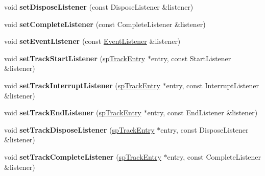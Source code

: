 \begin{DoxyCompactItemize}
void {\bfseries set\+Dispose\+Listener} (const Dispose\+Listener \&listener)
\item 
\mbox{\label{classspine_1_1SkeletonAnimation_a90da8648913d4abfa84f8b70ed5b7127}} 
void {\bfseries set\+Complete\+Listener} (const Complete\+Listener \&listener)
\item 
\mbox{\label{classspine_1_1SkeletonAnimation_add74538b2e902a827405724cefc2a5e1}} 
void {\bfseries set\+Event\+Listener} (const \hyperlink{classEventListener}{Event\+Listener} \&listener)
\item 
\mbox{\label{classspine_1_1SkeletonAnimation_a29901a201785b3f8ac7949756a6b1748}} 
void {\bfseries set\+Track\+Start\+Listener} (\hyperlink{structspTrackEntry}{sp\+Track\+Entry} $\ast$entry, const Start\+Listener \&listener)
\item 
\mbox{\label{classspine_1_1SkeletonAnimation_a39bbbe7345de1eec4015ab3636f51d6f}} 
void {\bfseries set\+Track\+Interrupt\+Listener} (\hyperlink{structspTrackEntry}{sp\+Track\+Entry} $\ast$entry, const Interrupt\+Listener \&listener)
\item 
\mbox{\label{classspine_1_1SkeletonAnimation_a64aca05c942018c39312b94d958b75de}} 
void {\bfseries set\+Track\+End\+Listener} (\hyperlink{structspTrackEntry}{sp\+Track\+Entry} $\ast$entry, const End\+Listener \&listener)
\item 
\mbox{\label{classspine_1_1SkeletonAnimation_aefb5d3e4bfcaac6d3faaff33aee9aaa4}} 
void {\bfseries set\+Track\+Dispose\+Listener} (\hyperlink{structspTrackEntry}{sp\+Track\+Entry} $\ast$entry, const Dispose\+Listener \&listener)
\item 
\mbox{\label{classspine_1_1SkeletonAnimation_a5e5eb7b82faf2c6e834555dc19a35b6d}} 
void {\bfseries set\+Track\+Complete\+Listener} (\hyperlink{structspTrackEntry}{sp\+Track\+Entry} $\ast$entry, const Complete\+Listener \&listener)
\item 
\mbox{\label{classspine_1_1SkeletonAnimation_a9f6037a941dbdcf0833982e7cbf72c4e}} 

\end{DoxyCompactItemize}
